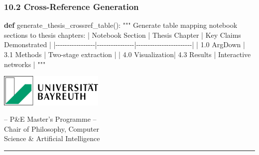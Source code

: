 \documentclass[
  11pt,
  letterpaper,
]{book}
\newenvironment{Shaded}{\begin{snugshade}}{\end{snugshade}}
\newcommand{\CommentTok}[1]{\textcolor[rgb]{0.37,0.37,0.37}{#1}}
\newcommand{\KeywordTok}[1]{\textcolor[rgb]{0.00,0.23,0.31}{\textbf{#1}}}
\newcommand{\NormalTok}[1]{\textcolor[rgb]{0.00,0.23,0.31}{#1}}
\begin{document}
\subsubsection{10.2 Cross-Reference
Generation}\label{cross-reference-generation}

\begin{Shaded}
\begin{Highlighting}[]
\KeywordTok{def}\NormalTok{ generate\_thesis\_crossref\_table():}
    \CommentTok{"""}
\CommentTok{    Generate table mapping notebook sections to thesis chapters:}
\CommentTok{    }
\CommentTok{    | Notebook Section | Thesis Chapter | Key Claims Demonstrated |}
\CommentTok{    |{-}{-}{-}{-}{-}{-}{-}{-}{-}{-}{-}{-}{-}{-}{-}{-}{-}|{-}{-}{-}{-}{-}{-}{-}{-}{-}{-}{-}{-}{-}{-}{-}{-}|{-}{-}{-}{-}{-}{-}{-}{-}{-}{-}{-}{-}{-}{-}{-}{-}{-}{-}{-}{-}{-}{-}{-}{-}|}
\CommentTok{    | 1.0 ArgDown     | 3.1 Methods    | Two{-}stage extraction   |}
\CommentTok{    | 4.0 Visualization| 4.3 Results   | Interactive networks   |}
\CommentTok{    """}
\end{Highlighting}
\end{Shaded}



\backmatter
\printbibliography[title=Bibliography]



\clearpage
\thispagestyle{empty} %

\newpage


\begin{minipage}{0.3\textwidth}
  \includegraphics[width=5cm]{latex/uni-bayreuth-logo.png}
\end{minipage}
\hfill
\begin{minipage}{0.9\textwidth}
  \begin{center}
    -- P\&E Master's Programme --\\
    Chair of Philosophy, Computer\\
    Science \& Artificial Intelligence
  \end{center}
\end{minipage}

\vspace{1.5cm}
\hrule
\vspace{2.5cm}
\end{document}
